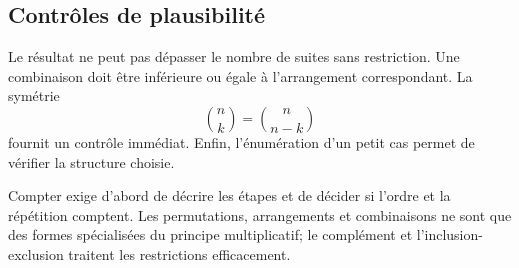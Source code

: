 \subsection{Contrôles de plausibilité}

Le résultat ne peut pas dépasser le nombre de suites sans restriction. Une combinaison doit être inférieure ou égale à l'arrangement correspondant. La symétrie
\[
\binom nk=\binom n{n-k}
\]
fournit un contrôle immédiat. Enfin, l'énumération d'un petit cas permet de vérifier la structure choisie.

\begin{summarybox}
Compter exige d'abord de décrire les étapes et de décider si l'ordre et la répétition comptent. Les permutations, arrangements et combinaisons ne sont que des formes spécialisées du principe multiplicatif; le complément et l'inclusion-exclusion traitent les restrictions efficacement.
\end{summarybox}

